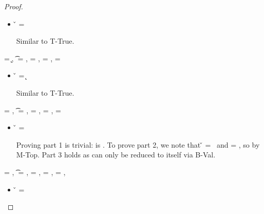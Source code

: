 \begin{lemma}
\begin{proof}
\begin{case}[T-True]
\begin{case}[T-HMap]
  \begin{itemize}
    \item[]
      \begin{subcase}[B-Val] \v{} = {}

        Similar to T-True.
      \end{subcase}
  \end{itemize}
\end{case}

\begin{case}[T-Kw] \e{} = {\k{}},
  \t{} = {\Value{\k{}}},
  \thenprop{\prop{}} = {\topprop{}},
  \elseprop{\prop{}} = {\botprop{}},
  \object{} = {\emptyobject{}}

  \begin{itemize}
    \item[]
      \begin{subcase}[B-Val] \v{} = {\k{}}

        Similar to T-True.
      \end{subcase}
  \end{itemize}
\end{case}

\end{case}

\begin{case}[T-False]
\e{} = \false, \t{} = \False, \thenprop{\prop{}} = \botprop{}, \elseprop{\prop{}} = \topprop{}, \object{} = \emptyobject{}

\begin{itemize}
  \item[] 
    \begin{subcase}[B-Val]
      \v{} = \false{}

Proving part 1 is trivial: \object{} is \emptyobject. To prove part 2, we note that \v{} = \false\ 
and \elseprop{\prop{}} = \topprop{}, so \satisfies{\openv{}}{\elseprop{\prop{}}} by M-Top. 
Part 3 holds as \e{} can only be reduced to itself via B-Val.
\end{subcase}

\end{itemize}
\end{case}

\begin{case}[T-Nil]
\e{} = \nil, \t{} = \Nil, \thenprop{\prop{}} = \botprop{}, \elseprop{\prop{}} = \topprop{}, \object{} = \emptyobject{},

\begin{itemize}
  \item[] 
    \begin{subcase}[B-Val] 
      \v{} = \nil{}


\end{subcase}
\end{itemize}
\end{case}
\end{proof}
\end{lemma}
